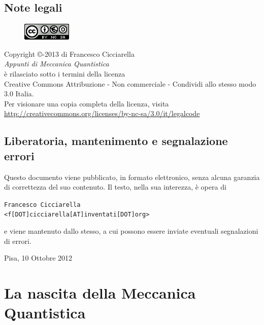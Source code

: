 \documentclass[10pt,a4paper]{report}
\theoremstyle{definition}
\numberwithin{equation}{section}
\begin{document}
\section*{Note legali}
\begin{center}
\begin{figure}[htbp]
\centering
\includegraphics[scale=1]{88x31.png}
\end{figure}
\vspace{0.5cm}
Copyright \copyright {}-2013 di Francesco Cicciarella \\
\textit{Appunti di Meccanica Quantistica} \\	
è rilasciato sotto i termini della licenza \\
Creative Commons Attribuzione - Non commerciale - Condividi allo stesso modo 3.0 Italia. \\
Per visionare una copia completa della licenza, visita \\
\url{http://creativecommons.org/licenses/by-nc-sa/3.0/it/legalcode}
\end{center}
\section*{Liberatoria, mantenimento e segnalazione errori}
Questo documento viene pubblicato, in formato elettronico, senza alcuna garanzia di correttezza del suo contenuto. Il testo, nella sua interezza, è opera di \\

\vspace{0.3cm}
\begin{flushleft}
\texttt{Francesco Cicciarella}\\
\texttt{<f[DOT]cicciarella[AT]inventati[DOT]org>}
\end{flushleft}
\vspace{0.3cm}
e viene mantenuto dallo stesso, a cui possono essere inviate eventuali segnalazioni di errori.
\vspace{1cm}
\begin{flushright}
Pisa, 10 Ottobre 2012
\end{flushright}
\pagebreak


\tableofcontents
\pagebreak
\chapter{La nascita della Meccanica Quantistica}
\end{document}
